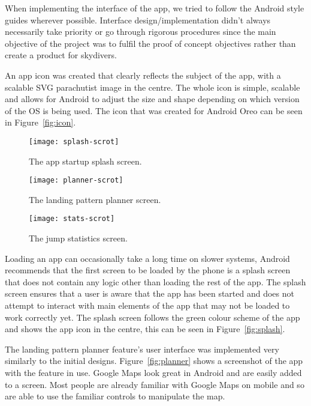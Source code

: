 When implementing the interface of the app, we tried to follow the Android style guides wherever possible. Interface design/implementation didn't always necessarily take priority or go through rigorous procedures since the main objective of the project was to fulfil the proof of concept objectives rather than create a product for skydivers.

An app icon was created that clearly reflects the subject of the app, with a scalable SVG parachutist image in the centre. The whole icon is simple, scalable and allows for Android to adjust the size and shape depending on which version of the OS is being used. The icon that was created for Android Oreo can be seen in Figure~\vref{fig:icon}.

\begin{figure}[h]
  \centering
  \captionsetup{width=0.24\textwidth}
  \begin{minipage}[b]{0.25\textwidth}
    \texttt{[image: splash-scrot]}
    \caption{The app startup splash screen.}\label{fig:splash}
  \end{minipage}%
  \hspace{1.5cm}
  \begin{minipage}[b]{0.25\textwidth}
    \texttt{[image: planner-scrot]}
    \caption{The landing pattern planner screen.}\label{fig:planner}
  \end{minipage}%
  \hspace{1.5cm}
  \begin{minipage}[b]{0.25\textwidth}
    \texttt{[image: stats-scrot]}
    \caption{The jump statistics screen.}\label{fig:stats}
  \end{minipage}
\end{figure}

Loading an app can occasionally take a long time on slower systems, Android recommends that the first screen to be loaded by the phone is a splash screen that does not contain any logic other than loading the rest of the app. The splash screen ensures that a user is aware that the app has been started and does not attempt to interact with main elements of the app that may not be loaded to work correctly yet. The splash screen follows the green colour scheme of the app and shows the app icon in the centre, this can be seen in Figure~\vref{fig:splash}.

The landing pattern planner feature's user interface was implemented very similarly to the initial designs. Figure~\vref{fig:planner} shows a screenshot of the app with the feature in use. Google Maps look great in Android and are easily added to a screen. Most people are already familiar with Google Maps on mobile and so are able to use the familiar controls to manipulate the map.

